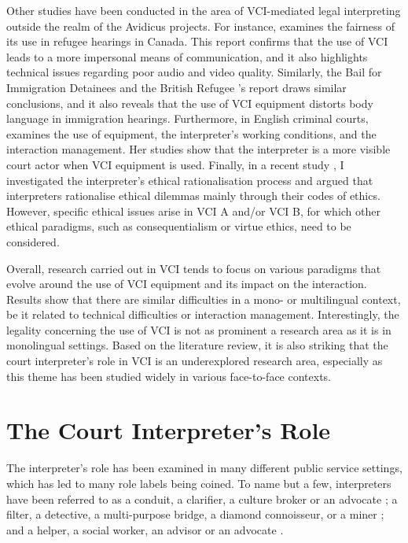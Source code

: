 \documentclass[output=paper]{langsci/langscibook}
\begin{document}
Other studies have been conducted in the area of \textsc{VCI}-mediated legal interpreting outside the realm of the Avidicus projects. For instance, \citet{Ellis2004} examines the fairness of its use in refugee hearings in Canada. This report confirms that the use of \textsc{VCI} leads to a more impersonal means of communication, and it also highlights technical issues regarding poor audio and video quality. Similarly, the Bail for Immigration Detainees and the British Refugee \citet{Bail2008}’s report draws similar conclusions, and it also reveals that the use of \textsc{VCI} equipment distorts body language in immigration hearings. Furthermore, in English criminal courts, \citet{Fowler2012} examines the use of equipment, the interpreter’s working conditions, and the interaction management. Her studies show that the interpreter is a more visible court actor when \textsc{VCI} equipment is used. Finally, in a recent study \citet{Devaux2017a}, I investigated the interpreter’s ethical rationalisation process and argued that interpreters rationalise ethical dilemmas mainly through their codes of ethics. However, specific ethical issues arise in \textsc{VCI} A and/or \textsc{VCI} B, for which other ethical paradigms, such as consequentialism or virtue ethics, need to be considered. 

Overall, research carried out in \textsc{VCI} tends to focus on various paradigms that evolve around the use of \textsc{VCI} equipment and its impact on the interaction. Results show that there are similar difficulties in a mono- or multilingual context, be it related to technical difficulties or interaction management. Interestingly, the legality concerning the use of \textsc{VCI} is not as prominent a research area as it is in monolingual settings. Based on the literature review, it is also striking that the court interpreter’s role in \textsc{VCI} is an underexplored research area, especially as this theme has been studied widely in various face-to-face contexts. 

\section{The Court Interpreter’s Role}
\label{sec:devaux:3}
The interpreter’s role has been examined in many different public service settings, which has led to many role labels being coined. To name but a few, interpreters have been referred to as a conduit, a clarifier, a culture broker or an advocate \citep{Niska2002}; a filter, a detective, a multi-purpose bridge, a diamond connoisseur, or a miner \citep{Angelelli2004}; and a helper, a social worker, an advisor or an advocate \citep{Grbic2011}.
\end{document}
